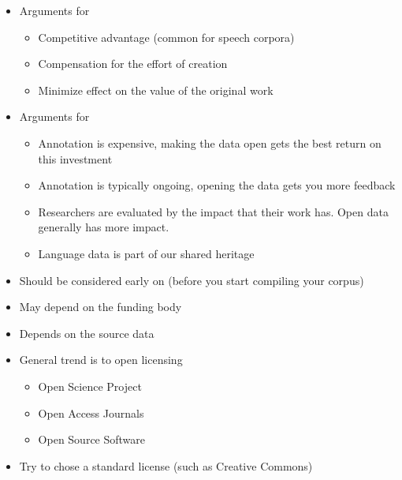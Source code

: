 \documentclass[a4paper,landscape,headrule,footrule,xetex]{foils}
\begin{document}
\MyLogo{}
\begin{itemize}
\item Arguments for 
  \begin{itemize}
  \item Competitive advantage (common for speech corpora)
  \item Compensation for the effort of creation
  \item Minimize effect on the value of the original work
  \end{itemize}
\item Arguments for 
  \begin{itemize}
  \item Annotation is expensive, making the data open gets the best
    return on this investment
  \item Annotation is typically ongoing, opening the data gets you
    more feedback
 \item Researchers are evaluated by the impact that their work has.
   Open data generally has more impact.
  \item Language data is part of our shared heritage
  \end{itemize}
\end{itemize}

\begin{itemize}
\item Should be considered early on (before you start compiling your corpus)
\item May depend on the funding body
\item Depends on the source data
\item General trend is to open licensing
  \begin{itemize}
  \item Open Science Project
  \item Open Access Journals
  \item Open Source Software
  \end{itemize}
\item Try to chose a standard license (such as Creative Commons)
\end{itemize}
\end{document}
